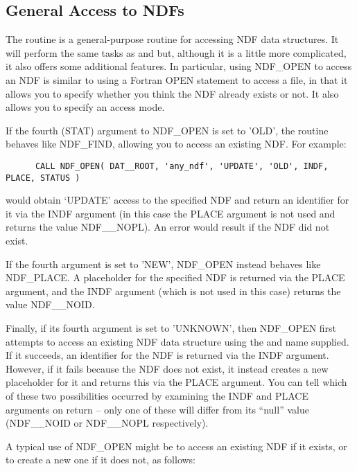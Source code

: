 \subsection{\label{ss:generalaccess}General Access to NDFs}

The routine  is a general-purpose routine for accessing NDF
data structures. It will perform the same tasks as  and
 but, although it is a little more complicated, it also
offers some additional features. In particular, using NDF\_OPEN to
access an NDF is similar to using a Fortran OPEN statement to access a
file, in that it allows you to specify whether you think the NDF
already exists or not. It also allows you to specify an access mode.

If the fourth (STAT) argument to NDF\_OPEN is set to 'OLD', the routine
behaves like NDF\_FIND, allowing you to access an existing NDF.  For
example:

\small
\begin{verbatim}
      CALL NDF_OPEN( DAT__ROOT, 'any_ndf', 'UPDATE', 'OLD', INDF, PLACE, STATUS )
\end{verbatim}
\normalsize

would obtain `UPDATE' access to the specified NDF and return an
identifier for it via the INDF argument (in this case the PLACE
argument is not used and returns the value NDF\_\_NOPL).  An error
would result if the NDF did not exist.

If the fourth argument is set to 'NEW', NDF\_OPEN instead behaves like
NDF\_PLACE. A placeholder for the specified NDF is returned via the
PLACE argument, and the INDF argument (which is not used in this case)
returns the value NDF\_\_NOID.

Finally, if its fourth argument is set to 'UNKNOWN', then NDF\_OPEN
first attempts to access an existing NDF data structure using the
 and name supplied. If it
succeeds, an identifier for the NDF
is returned via the INDF argument. However, if it fails because the
NDF does not exist, it instead creates a new placeholder for it and
returns this via the PLACE argument. You can tell which of these two
possibilities occurred by examining the INDF and PLACE arguments on
return -- only one of these will differ from its ``null'' value
(NDF\_\_NOID or NDF\_\_NOPL respectively).

A typical use of NDF\_OPEN might be to access an existing NDF if it
exists, or to create a new one if it does not, as follows:

